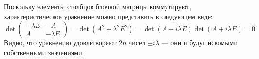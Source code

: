 \documentclass{article}
\begin{document}
Поскольку элементы столбцов блочной матрицы коммутируют, характеристическое уравнение можно представить в следующем виде:
$$\det \begin{pmatrix}-\lambda E&-A\\A&-\lambda E\end{pmatrix} = \det(A^2 + \lambda^2 E^2) = \det(A - i \lambda E) \det(A + i \lambda E) = 0$$
Видно, что уравнению удовлетворяют $2n$ чисел $\pm i \lambda$ --- они и будут искомыми собственными значениями.
\end{document}
